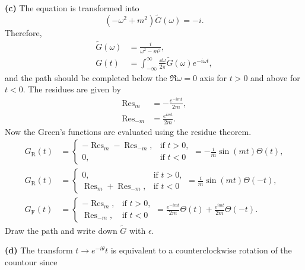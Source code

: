 \documentclass{article}
\makeatletter
\newcommand*{\shifttext}[1]{%
  \settowidth{\@tempdima}{#1}%
  \hspace{-\@tempdima}#1%
}
\newcommand{\plabel}[1]{%
\shifttext{\textbf{#1}\quad}%
}
\makeatother
\begin{document}
\plabel{(c)}%
The equation is transformed into
\[ (-\omega^2 + m^2) \tilde{G}(\omega) = -i. \]
Therefore,
\begin{align*}
    \tilde{G}(\omega) &= \frac{i}{\omega^2 - m^2}, \\
    G(t) &= \int_{-\infty}^\infty \frac{\dd{\omega}}{2\pi} \tilde{G}(\omega) e^{-i\omega t},
\end{align*}
and the path should be completed below the $\Re \omega = 0$ axis for $t>0$ and above for $t<0$.
The residues are given by
\begin{align*}
    \operatorname{Res}_{m} &= -\frac{e^{-imt}}{2m}, \\
    \operatorname{Res}_{-m} &= \frac{e^{imt}}{2m}.
\end{align*}
Now the Green's functions are evaluated using the residue theorem.
\begin{align*}
    G_{\mathrm{R}}(t) &= \begin{cases}
        -\operatorname{Res}_m-\operatorname{Res}_{-m}, & \text{if } t>0, \\
        0, & \text{if } t<0
    \end{cases} = -\frac{i}{m}\sin(mt) \Theta(t), \\
    G_{\mathrm{R}}(t) &= \begin{cases}
        0, & \text{if } t>0, \\
        \operatorname{Res}_m + \operatorname{Res}_{-m}, & \text{if } t<0
    \end{cases} = \frac{i}{m}\sin(mt) \Theta(-t), \\
    G_{\mathrm{F}}(t) &= \begin{cases}
        -\operatorname{Res}_{m}, & \text{if } t>0, \\
        \operatorname{Res}_{-m}, & \text{if } t<0
    \end{cases} = \frac{e^{-imt}}{2m} \Theta(t) + \frac{e^{imt}}{2m} \Theta(-t).
\end{align*}
{\color{red}Draw the path and write down $\tilde{G}$ with $\epsilon$.}

\plabel{(d)}%
The transform $t \rightarrow e^{-i\theta}t$ is equivalent to a counterclockwise rotation of the countour since
\end{document}
